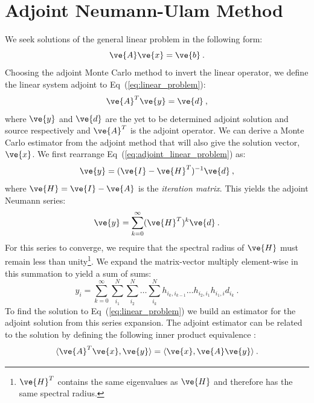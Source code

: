 \documentclass[preprint,11pt]{elsarticle}
\begin{document}
\section{Adjoint Neumann-Ulam Method}
\label{sec:adjoint_nu}

We seek solutions of the general linear problem in the following form:
\begin{equation}
  \ve{A} \ve{x} = \ve{b}\:.
  \label{eq:linear_problem}
\end{equation}
Choosing the adjoint Monte Carlo method to invert the linear operator, we
define the linear system adjoint to Eq~(\ref{eq:linear_problem}):
\begin{equation}
  \ve{A}^T \ve{y} = \ve{d}\:,
  \label{eq:adjoint_linear_problem}
\end{equation}
where $\ve{y}$ and $\ve{d}$ are the yet to be determined adjoint solution and
source respectively and $\ve{A}^T$ is the adjoint operator. We can derive a
Monte Carlo estimator from the adjoint method that will also give the solution
vector, $\ve{x}$. We first rearrange Eq~(\ref{eq:adjoint_linear_problem}) as:
\begin{equation}
  \ve{y} = (\ve{I} - \ve{H}^T)^{-1} \ve{d}\:,
  \label{eq:adjoint_split_system_2}
\end{equation}
where $\ve{H} = \ve{I} - \ve{A}$ is the \textit{iteration matrix}.
This yields the adjoint Neumann series:
\begin{equation}
  \ve{y} = \sum_{k=0}^{\infty} (\ve{H}^T)^k\ve{d}\:.
  \label{eq:adjoint_neumann_series}
\end{equation}
For this series to converge, we require that the spectral radius of $\ve{H}$
must remain less than unity\footnote{$\ve{H}^T$ contains the same eigenvalues
  as $\ve{H}$ and therefore has the same spectral radius.}. We expand the
matrix-vector multiply element-wise in this summation to yield a sum of sums:
\begin{equation}
  y_i = \sum_{k=0}^{\infty}\sum_{i_1}^{N}\sum_{i_2}^{N}\ldots
  \sum_{i_k}^{N}h_{i_k,i_{k-1}}\ldots h_{i_2,i_1} h_{i_1,i} d_{i_k}\:.
  \label{eq:adjoint_neumann_solution}
\end{equation}
To find the solution to Eq~(\ref{eq:linear_problem}) we build an
estimator for the adjoint solution from this series expansion. The
adjoint estimator can be related to the solution by defining the
following inner product equivalence \cite{spanier_monte_1969}:
\begin{equation}
  \langle \ve{A}^T \ve{x}, \ve{y} \rangle = \langle \ve{x}, \ve{A}
  \ve{y} \rangle\:.
  \label{eq:adjoint_operator_product}
\end{equation}
\end{document}
